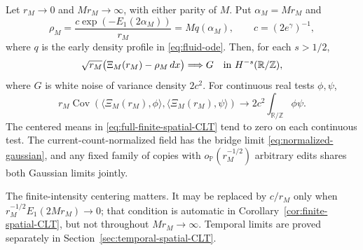 \documentclass[11pt,letterpaper]{article}
\newcommand{\PP}{\mathbb P}\newcommand{\EE}{\mathbb E}
\newcommand{\T}{\mathbb R/\mathbb Z}\newcommand{\Leb}{\operatorname{Leb}}
\begin{document}
\begin{theorem}
\label{thm:full-finite-spatial-CLT}
Let $r_M\to0$ and $Mr_M\to\infty$, with either parity of $M$.
Put $\alpha_M=Mr_M$ and
\[
 \rho_M=\frac{c\exp(-E_1(2\alpha_M))}{r_M}
        =M q(\alpha_M),\qquad c=(2e^\gamma)^{-1},
\]
where $q$ is the early density profile in \eqref{eq:fluid-ode}.
Then, for each $s>1/2$,
\begin{equation}\label{eq:full-finite-spatial-CLT}
 \sqrt{r_M}\bigl(\Xi_M(r_M)-\rho_M\,dx\bigr)
            \Longrightarrow G\quad\hbox{in }H^{-s}(\T),
\end{equation}
where $G$ is white noise of variance density $2c^2$.
For continuous real tests $\phi,\psi$,
\begin{equation}\label{eq:full-finite-spatial-covariance}
 r_M\operatorname{Cov}(\langle\Xi_M(r_M),\phi\rangle,
                       \langle\Xi_M(r_M),\psi\rangle)
          \longrightarrow2c^2\int_{\T}\phi\psi.
\end{equation}
The centered means in \eqref{eq:full-finite-spatial-CLT} tend to
zero on each continuous test. The current-count-normalized field
has the bridge limit \eqref{eq:normalized-gaussian}, and any
fixed family of copies with $o_{\PP}(r_M^{-1/2})$ arbitrary edits
shares both Gaussian limits jointly.

The finite-intensity centering matters. It may be replaced by
$c/r_M$ only when
$r_M^{-1/2}E_1(2Mr_M)\to0$; that condition is automatic in
Corollary~\ref{cor:finite-spatial-CLT}, but not throughout
$Mr_M\to\infty$. Temporal limits are proved separately in
Section~\ref{sec:temporal-spatial-CLT}.
\end{theorem}
\end{document}

